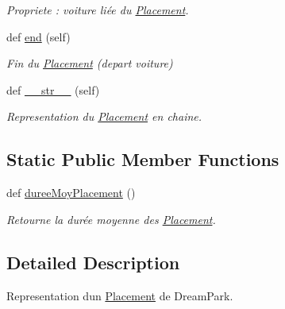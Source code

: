 \begin{DoxyCompactItemize}
\begin{DoxyCompactList}\small\item\em Propriete \+: voiture liée du \hyperlink{classsrc_1_1m_1_1_parking_1_1_placement}{Placement}. \end{DoxyCompactList}\item 
\hypertarget{classsrc_1_1m_1_1_parking_1_1_placement_a092238cef885199f1c796f0737ac6d95}{}def \hyperlink{classsrc_1_1m_1_1_parking_1_1_placement_a092238cef885199f1c796f0737ac6d95}{end} (self)\label{classsrc_1_1m_1_1_parking_1_1_placement_a092238cef885199f1c796f0737ac6d95}

\begin{DoxyCompactList}\small\item\em Fin du \hyperlink{classsrc_1_1m_1_1_parking_1_1_placement}{Placement} (depart voiture) \end{DoxyCompactList}\item 
\hypertarget{classsrc_1_1m_1_1_parking_1_1_placement_ac7cd977990b070db8278ad4a15da28a4}{}def \hyperlink{classsrc_1_1m_1_1_parking_1_1_placement_ac7cd977990b070db8278ad4a15da28a4}{\+\_\+\+\_\+str\+\_\+\+\_\+} (self)\label{classsrc_1_1m_1_1_parking_1_1_placement_ac7cd977990b070db8278ad4a15da28a4}

\begin{DoxyCompactList}\small\item\em Representation du \hyperlink{classsrc_1_1m_1_1_parking_1_1_placement}{Placement} en chaine. \end{DoxyCompactList}\end{DoxyCompactItemize}
\subsection*{Static Public Member Functions}
\begin{DoxyCompactItemize}
\item 
def \hyperlink{classsrc_1_1m_1_1_parking_1_1_placement_a7546b4a9eac3ff21fb118bad84589bd2}{duree\+Moy\+Placement} ()
\begin{DoxyCompactList}\small\item\em Retourne la durée moyenne des \hyperlink{classsrc_1_1m_1_1_parking_1_1_placement}{Placement}. \end{DoxyCompactList}\end{DoxyCompactItemize}


\subsection{Detailed Description}
Representation d\textquotesingle{}un \hyperlink{classsrc_1_1m_1_1_parking_1_1_placement}{Placement} de Dream\+Park. 

